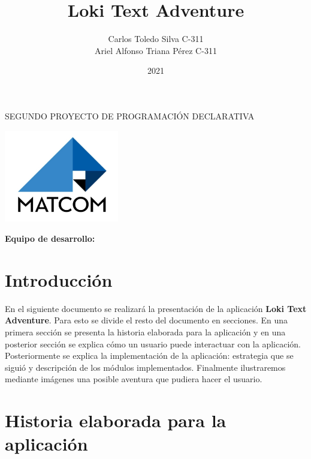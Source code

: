 \documentclass[12pt]{article}
\begin{document}
\title{Loki Text Adventure}
\author{Carlos Toledo Silva C-311\\
		    Ariel Alfonso Triana Pérez C-311}
\date{2021}

\makeatletter
\begin{titlepage}
\centering

\vspace{5cm}

{ \Huge \textbf{\@title}}

\vspace{1cm}

SEGUNDO PROYECTO DE PROGRAMACIÓN DECLARATIVA

\vspace{5cm}

\includegraphics[width=5cm]{./img/logo-matcom.jpg}

\vspace{5cm}

\textbf{Equipo de desarrollo:}

 \@author

\vspace{1cm}

\@date
\end{titlepage}
	

	
\section{Introducción}

En el siguiente documento se realizará la presentación de la aplicación \textbf{Loki Text Adventure}. Para esto se divide el resto del documento en secciones. En una primera sección se presenta la historia elaborada para la aplicación y en una posterior sección se explica cómo un usuario puede interactuar con la aplicación. Posteriormente se explica la implementación de la aplicación: estrategia que se siguió y descripción de los módulos implementados. Finalmente ilustraremos mediante im\'agenes una posible aventura que pudiera hacer el usuario.

\section{Historia elaborada para la aplicación}
\end{document}
